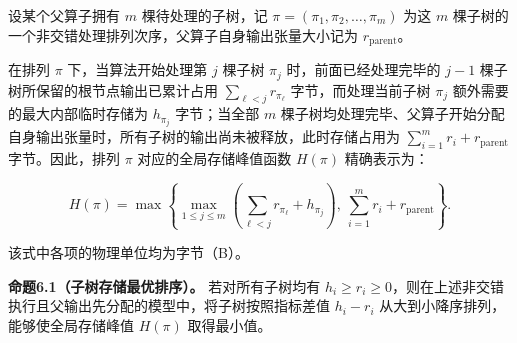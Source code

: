 \documentclass[anonymous,notoc]{gmcm2026}
\begin{document}
设某个父算子拥有 \(m\) 棵待处理的子树，记 \(\pi = (\pi_1, \pi_2, \dots, \pi_m)\) 为这 \(m\) 棵子树的一个非交错处理排列次序，父算子自身输出张量大小记为 \(r_{\mathrm{parent}}\)。

在排列 \(\pi\) 下，当算法开始处理第 \(j\) 棵子树 \(\pi_j\) 时，前面已经处理完毕的 \(j - 1\) 棵子树所保留的根节点输出已累计占用 \(\sum_{\ell < j} r_{\pi_\ell}\) 字节，而处理当前子树 \(\pi_j\) 额外需要的最大内部临时存储为 \(h_{\pi_j}\) 字节；当全部 \(m\) 棵子树均处理完毕、父算子开始分配自身输出张量时，所有子树的输出尚未被释放，此时存储占用为 \(\sum_{i=1}^m r_i + r_{\mathrm{parent}}\) 字节。因此，排列 \(\pi\) 对应的全局存储峰值函数 \(H(\pi)\) 精确表示为：

\begin{equation}
H(\pi) = \max \left\{ \max_{1 \le j \le m} \left( \sum_{\ell < j} r_{\pi_\ell} + h_{\pi_j} \right), \ \sum_{i=1}^m r_i + r_{\mathrm{parent}} \right\}.
\end{equation}

该式中各项的物理单位均为字节（B）。

\textbf{命题6.1（子树存储最优排序）。} 若对所有子树均有 \(h_i \ge r_i \ge 0\)，则在上述非交错执行且父输出先分配的模型中，将子树按照指标差值 \(h_i - r_i\) 从大到小降序排列，能够使全局存储峰值 \(H(\pi)\) 取得最小值。
\end{document}
